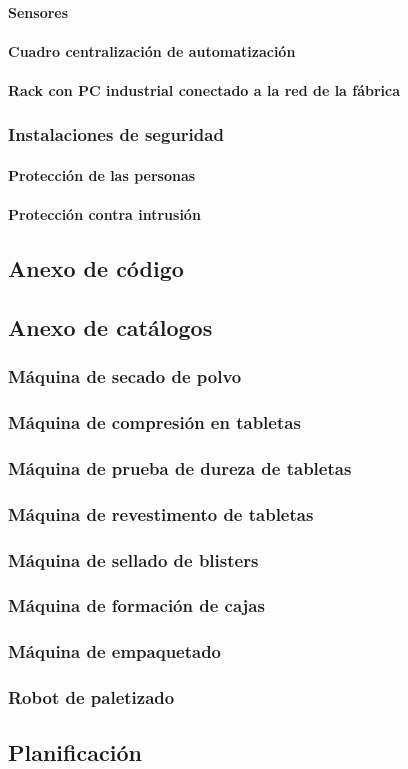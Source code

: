 \paragraph{Sensores }
\paragraph{Cuadro centralización de automatización}
\paragraph{Rack con PC industrial conectado a la red de la fábrica}
\subsubsection{Instalaciones de seguridad}
\paragraph{Protección de las personas}
\paragraph{Protección contra intrusión}

\subsection{Anexo de código}

\subsection{Anexo de catálogos}
\subsubsection{Máquina de secado de polvo}
\subsubsection{Máquina de compresión en tabletas}
\subsubsection{Máquina de prueba de dureza de tabletas}
\subsubsection{Máquina de revestimento de tabletas}
\subsubsection{Máquina de sellado de blisters}
\subsubsection{Máquina de formación de cajas}
\subsubsection{Máquina de empaquetado}
\subsubsection{Robot de paletizado}

\subsection{Planificación}

